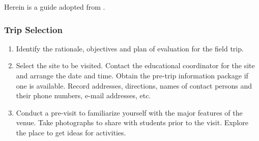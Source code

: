 Herein is a guide adopted from \parencite{campsilos}.

\subsubsection*{Trip Selection}
\begin{enumerate}
\item Identify the rationale, objectives and plan of evaluation for the field trip.
\item Select the site to be visited. Contact the educational coordinator for the site and arrange the
date and time. Obtain the pre-trip information package if one is available. Record addresses,
directions, names of contact persons and their phone numbers, e-mail addresses, etc.
\item Conduct a pre-visit to familiarize yourself with the major features of the venue. Take
photographs to share with students prior to the visit. Explore the place to get ideas for activities.
\end{enumerate}
